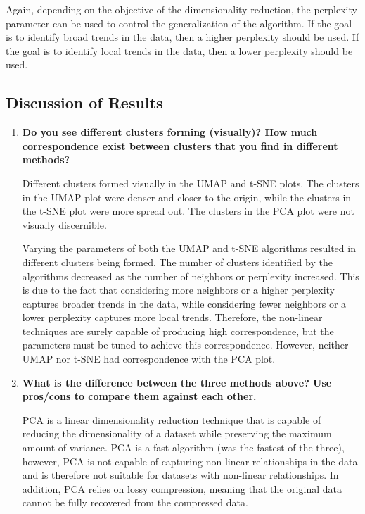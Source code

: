 \documentclass[12pt]{article}
\begin{document}
Again, depending on the objective of the dimensionality reduction, the perplexity parameter can be used to control the generalization of the algorithm. If the goal is to identify broad trends in the data, then a higher perplexity should be used. If the goal is to identify local trends in the data, then a lower perplexity should be used.

\subsection{Discussion of Results}
\begin{enumerate}
    \item \textbf{Do you see different clusters forming (visually)? How much correspondence exist between clusters that you find in different methods?}

    Different clusters formed visually in the UMAP and t-SNE plots. The clusters in the UMAP plot were denser and closer to the origin, while the clusters in the t-SNE plot were more spread out. The clusters in the PCA plot were not visually discernible.  

    Varying the parameters of both the UMAP and t-SNE algorithms resulted in different clusters being formed. The number of clusters identified by the algorithms decreased as the number of neighbors or perplexity increased. This is due to the fact that considering more neighbors or a higher perplexity captures broader trends in the data, while considering fewer neighbors or a lower perplexity captures more local trends. Therefore, the non-linear techniques are surely capable of producing high correspondence, but the parameters must be tuned to achieve this correspondence. However, neither UMAP nor t-SNE had correspondence with the PCA plot.

    \item \textbf{What is the difference between the three methods above? Use pros/cons to compare them against each other.}
    
    PCA is a linear dimensionality reduction technique that is capable of reducing the dimensionality of a dataset while preserving the maximum amount of variance. PCA is a fast algorithm (was the fastest of the three), however, PCA is not capable of capturing non-linear relationships in the data and is therefore not suitable for datasets with non-linear relationships. In addition, PCA relies on lossy compression, meaning that the original data cannot be fully recovered from the compressed data.


\end{enumerate}
\end{document}
